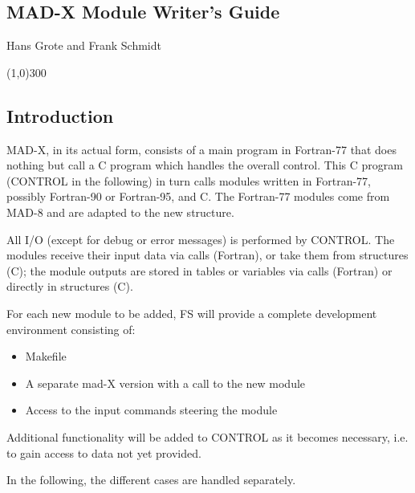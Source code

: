 



\begin{center}

\subsection{MAD-X Module Writer's Guide}
Hans Grote and Frank Schmidt 
\end{center}


\line(1,0){300}


\subsection{Introduction} MAD-X, in its actual form, consists of a main program in Fortran-77 that  does nothing but call a C program which handles the overall control.  This C program (CONTROL in the following) in turn calls modules written in Fortran-77, possibly  Fortran-90 or Fortran-95, and C. The Fortran-77 modules come from MAD-8 and are adapted to the new structure. 

 All I/O (except for debug or error messages) is performed by CONTROL. The modules receive their input data via calls (Fortran), or take them from structures (C); the module outputs are stored in tables or variables via calls (Fortran) or directly in structures (C). 

 For each new module to be added, FS will provide a complete development environment consisting of: 
\begin{itemize}
	\item Makefile
	\item A separate mad-X version with a call to the new module
	\item Access to the input commands steering the module
\end{itemize} Additional functionality will be added to CONTROL as it becomes necessary, i.e. to gain access to data not yet provided. 

 In the following, the different cases are handled separately. 

